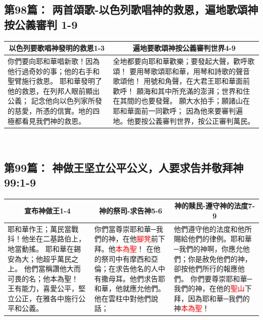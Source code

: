 \subsection{第98篇： 两首頌歌-以色列歌唱神的救恩，遍地歌頌神按公義審判 1-9}
\begin{table}[H]
\centering
\begin{tabular}{p{6.7cm}|p{9.6cm}}\hline\hline
\multicolumn{1}{c|}{以色列要歌唱神發明的救恩1-3}&\multicolumn{1}{c}{遍地要歌頌神按公義審判世界4-9}\\\hline
你們要向耶和華唱新歌！因為他行過奇妙的事；他的右手和聖臂施行救恩。
耶和華發明了他的救恩，在列邦人眼前顯出公義；
記念他向以色列家所發的慈愛，所憑的信實。地的四極都看見我們神的救恩。
&全地都要向耶和華歡樂；要發起大聲，歡呼歌頌！
要用琴歌頌耶和華，用琴和詩歌的聲音歌頌他！
用號和角聲，在大君王耶和華面前歡呼！
願海和其中所充滿的澎湃；世界和住在其間的也要發聲。
願大水拍手；願諸山在耶和華面前一同歡呼；
因為他來要審判遍地。他要按公義審判世界，按公正審判萬民。\\\hline
\end{tabular}
\end{table} 

\subsection{第99篇： 神做王坚立公平公义，人要求告并敬拜神 99:1-9}
\begin{table}[H]
\centering
\begin{tabular}{p{5.5cm}|p{}|p{}}\hline\hline
\multicolumn{1}{c|}{宣布神做王1-4}&\multicolumn{1}{c|}{神的祭司-求告神5-6}&\multicolumn{1}{c}{神的赎民-遵守神的法度7-9}\\\hline
耶和華作王；萬民當戰抖！他坐在二基路伯上，地當動搖。
耶和華在錫安為大；他超乎萬民之上。
他們當稱讚他大而可畏的名；他本為聖！
王有能力，喜愛公平，堅立公正，在雅各中施行公平和公義。
&你們當尊崇耶和華─我們的神，在他\textcolor{red}{腳凳}前下拜。他\textcolor{red}{本為聖}！
在他的祭司中有摩西和亞倫；在求告他名的人中有撒母耳。他們求告耶和華，他就應允他們。
他在雲柱中對他們說話；
&他們遵守他的法度和他所賜給他們的律例。耶和華─我們的神啊，你應允他們；你是赦免他們的神，卻按他們所行的報應他們。
你們要尊崇耶和華─我們的神，在他的\textcolor{red}{聖山}下拜，因為耶和華─我們的神\textcolor{red}{本為聖}！\\\hline
\end{tabular}
\end{table} 





